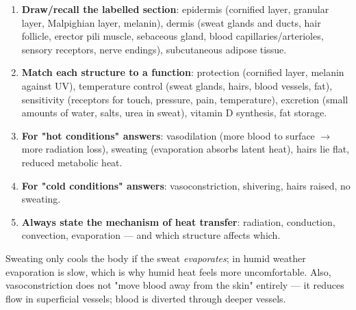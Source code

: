\documentclass[11pt]{article}
\newcommand{\cle}[1]{{\popxbold\color{popdark}#1}}
\begin{document}
\begin{methode}
\begin{enumerate}
\item \textbf{Draw/recall the labelled section}: epidermis (cornified layer, granular layer, Malpighian layer, melanin), dermis (sweat glands and ducts, hair follicle, erector pili muscle, sebaceous gland, blood capillaries/arterioles, sensory receptors, nerve endings), subcutaneous \cle{adipose tissue}.
\item \textbf{Match each structure to a function}: protection (cornified layer, melanin against UV), temperature control (sweat glands, hairs, blood vessels, fat), sensitivity (receptors for touch, pressure, pain, temperature), excretion (small amounts of water, salts, urea in sweat), vitamin D synthesis, fat storage.
\item \textbf{For "hot conditions" answers}: vasodilation (more blood to surface $\rightarrow$ more radiation loss), sweating (evaporation absorbs latent heat), hairs lie flat, reduced metabolic heat.
\item \textbf{For "cold conditions" answers}: vasoconstriction, shivering, hairs raised, no sweating.
\item \textbf{Always state the mechanism of heat transfer}: radiation, conduction, convection, evaporation — and which structure affects which.
\end{enumerate}
\end{methode}

\begin{attention}
Sweating only cools the body if the sweat \emph{evaporates}; in humid weather evaporation is slow, which is why humid heat feels more uncomfortable. Also, vasoconstriction does not "move blood away from the skin" entirely — it reduces flow in superficial vessels; blood is diverted through deeper vessels.
\end{attention}
\end{document}
